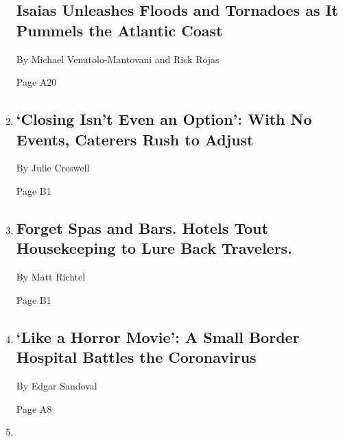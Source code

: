 \begin{enumerate}
{  \subsection{Isaias Unleashes Floods and Tornadoes as It Pummels the
  Atlantic
  Coast}\label{isaias-unleashes-floods-and-tornadoes-as-it-pummels-the-atlantic-coast}}

  By Michael Venutolo-Mantovani and Rick Rojas

  Page A20
\item
  \href{/2020/08/04/business/coronavirus-struggling-caterers.html}{}

  \hypertarget{closing-isnt-even-an-option-with-no-events-caterers-rush-to-adjust}{%
  \subsection{`Closing Isn't Even an Option': With No Events, Caterers
  Rush to
  Adjust}\label{closing-isnt-even-an-option-with-no-events-caterers-rush-to-adjust}}

  By Julie Creswell

  Page B1
\item
  \href{/2020/08/04/health/coronavirus-hotels-infect.html}{}

  \hypertarget{forget-spas-and-bars-hotels-tout-housekeeping-to-lure-back-travelers}{%
  \subsection{Forget Spas and Bars. Hotels Tout Housekeeping to Lure
  Back
  Travelers.}\label{forget-spas-and-bars-hotels-tout-housekeeping-to-lure-back-travelers}}

  By Matt Richtel

  Page B1
\item
  \href{/2020/08/04/us/texas-coronavirus-rio-grande-valley-starr-county.html}{}

  \hypertarget{like-a-horror-movie-a-small-border-hospital-battles-the-coronavirus}{%
  \subsection{`Like a Horror Movie': A Small Border Hospital Battles the
  Coronavirus}\label{like-a-horror-movie-a-small-border-hospital-battles-the-coronavirus}}

  By Edgar Sandoval

  Page A8
\item
  \href{/2020/08/04/us/virus-testing-delays.html}{}


\end{enumerate}
